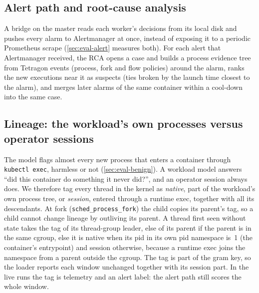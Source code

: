 \subsection{Alert path and root-cause analysis}

A bridge on the master reads each worker's decisions from its local disk and pushes every alarm to Alertmanager at once,
instead of exposing it to a periodic Prometheus scrape (\cref{sec:eval-alert} measures both). For each alert that
Alertmanager received, the RCA opens a case and builds a process evidence tree from Tetragon events (process, fork and
flow policies) around the alarm, ranks the new executions near it as suspects (ties broken by the launch time closest
to the alarm), and merges later alarms of the same container within a cool-down into the same case.

\subsection{Lineage: the workload's own processes versus operator sessions}\label{sec:lineage}

The model flags almost every new process that enters a container through \texttt{kubectl exec}, harmless or not
(\cref{sec:eval-benign}). A workload model answers ``did this container do something it never did?'', and an operator
session always does. We therefore tag every thread in the kernel as \emph{native}, part of the workload's own process
tree, or \emph{session}, entered through a runtime exec, together with all its descendants. At fork
(\texttt{sched\_process\_fork}) the child copies its parent's tag, so a child cannot change lineage by outliving its
parent. A thread first seen without state takes the tag of its thread-group leader, else of its parent if the parent is
in the same cgroup, else it is native when its pid in its own pid namespace is~1 (the container's entrypoint) and
session otherwise, because a runtime exec joins the namespace from a parent outside the cgroup. The tag is part of the
gram key, so the loader reports each window unchanged together with its session part. In the live runs the tag is
telemetry and an alert label: the alert path still scores the whole window.
